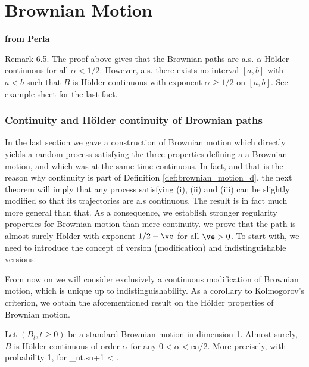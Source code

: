 
\chapter{Brownian Motion}


{\bf from Perla}

Remark 6.5. The proof above gives that the Brownian paths are a.s. $\alpha$-H\"older continuous for all $\alpha < 1/2$. However, a.s. there exists no interval $[a, b]$ with $a < b$ such that $B$ is H\"older continuous with exponent $\alpha \geq 1/2$ on $[a, b]$. See example sheet for the last fact.


\subsection{Continuity and H\"older continuity of Brownian paths}

In the last section we gave a construction of Brownian motion which directly yields a random process satisfying the three properties defining a a Brownian motion, and which was at the same time continuous. In fact, and that is the reason why continuity is part of Definition \ref{def:brownian_motion_d}, the next theorem will imply that any process satisfying (i), (ii) and (iii) can be slightly modified so that its trajectories are a.s continuous. The result is in fact much more general than that. As a consequence, we establish stronger regularity properties for Brownian motion than mere continuity. we prove that the path is almost surely H\"older with exponent $1/2 - \ve$ for all $\ve > 0$. To start with, we need to introduce the concept of version (modification) and indistinguishable versions.

From now on we will consider exclusively a continuous modification of Brownian motion, which is unique up to indistinguishability. As a corollary to Kolmogorov's criterion, we obtain the aforementioned result on the H\"older properties of Brownian motion.

\begin{corollary}
Let $(B_t, t \geq 0)$ be a standard Brownian motion in dimension 1. Almost surely, $B$ is H\"older-continuous of order $\alpha$ for any $0 < \alpha < \infty/2$. More precisely, with probability 1, for
\be
\sup_{n\leq t,s\leq n+1}  < \infty.
\ee
\end{corollary}

